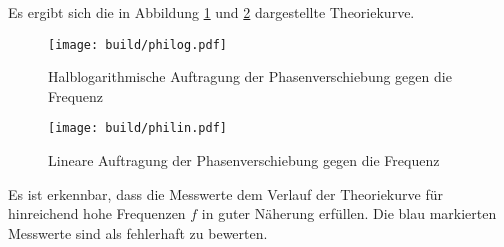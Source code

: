 Es ergibt sich die in Abbildung \ref{fig:philog2} und \ref{fig:philin2}
dargestellte Theoriekurve.


\begin{figure}
  \centering
  \texttt{[image: build/philog.pdf]}
  \caption{Halblogarithmische Auftragung der Phasenverschiebung gegen die Frequenz}
  \label{fig:philog2}
\end{figure}

\begin{figure}
  \centering
  \texttt{[image: build/philin.pdf]}
  \caption{Lineare Auftragung der Phasenverschiebung gegen die Frequenz}
  \label{fig:philin2}
\end{figure}

Es ist erkennbar, dass die Messwerte dem Verlauf der Theoriekurve für hinreichend
hohe Frequenzen $f$ in guter Näherung erfüllen. Die blau markierten Messwerte
sind als fehlerhaft zu bewerten.
